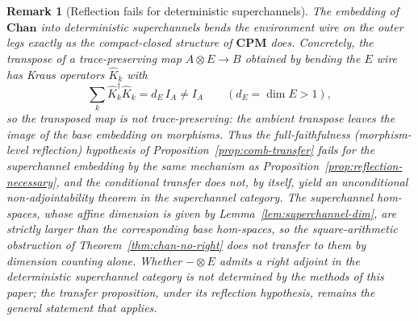 \documentclass[11pt]{article}
\newtheorem{remark}[theorem]{Remark}
\begin{document}
\begin{remark}[Reflection fails for deterministic superchannels]
\label{rem:superchannel-reflection}
The embedding of $\mathbf{Chan}$ into deterministic superchannels bends the
environment wire on the outer legs exactly as the compact-closed structure of
$\mathbf{CPM}$ does. Concretely, the transpose of a trace-preserving map
$A\otimes E\to B$ obtained by bending the $E$ wire has Kraus operators
$\widehat K_k$ with
\[
\sum_k\widehat K_k^{\dagger}\widehat K_k=d_E\,I_A\neq I_A
\qquad(d_E=\dim E>1),
\]
so the transposed map is not trace-preserving: the ambient transpose leaves the
image of the base embedding on morphisms. Thus the full-faithfulness
(morphism-level reflection) hypothesis of
Proposition~\ref{prop:comb-transfer} fails for the superchannel embedding by the
same mechanism as Proposition~\ref{prop:reflection-necessary}, and the
conditional transfer does not, by itself, yield an unconditional
non-adjointability theorem in the superchannel category. The superchannel
hom-spaces, whose affine dimension is given by
Lemma~\ref{lem:superchannel-dim}, are strictly larger than the corresponding
base hom-spaces, so the square-arithmetic obstruction of
Theorem~\ref{thm:chan-no-right} does not transfer to them by dimension counting
alone. Whether $-\otimes E$ admits a right adjoint in the deterministic
superchannel category is not determined by the methods of this paper; the
transfer proposition, under its reflection hypothesis, remains the general
statement that applies.
\end{remark}
\end{document}
